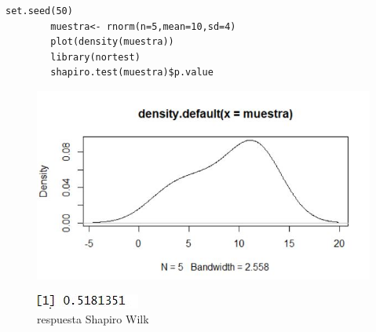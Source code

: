 \documentclass[12pt,hidelinks]{article}
\begin{document}
\begin{itemize}
	\begin{lstlisting}[frame=single]
		set.seed(50)
		muestra<- rnorm(n=5,mean=10,sd=4)
		plot(density(muestra))
		library(nortest)
		shapiro.test(muestra)$p.value
	\end{lstlisting}
	\begin{figure}[h!]
		\centering
		\includegraphics[width=0.8\linewidth]{images/3/ks_grafica.jpeg}\\
	\end{figure}
	\begin{figure}[h!]
		\centering
		\includegraphics[width=0.4\linewidth]{images/3/ks.JPG}
		\caption{respuesta Shapiro Wilk}
	\end{figure}
\end{itemize}
\end{document}
